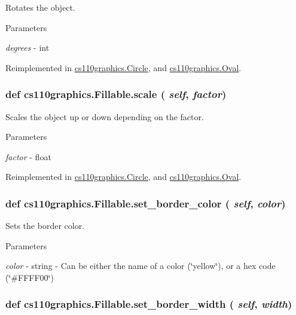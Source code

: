 Rotates the object. 
\begin{DoxyParams}{Parameters}
\item[{\em degrees}]-\/ int \end{DoxyParams}


Reimplemented in \hyperlink{classcs110graphics_1_1Circle_a0532651c10c084766ac3032c57107eb0}{cs110graphics.Circle}, and \hyperlink{classcs110graphics_1_1Oval_a98bb8103f19d2df5a875db6943fde6e2}{cs110graphics.Oval}.\hypertarget{classcs110graphics_1_1Fillable_a80d5b6b6d2ebae867dccecb803075749}{
\subsubsection[{scale}]{\setlength{\rightskip}{0pt plus 5cm}def cs110graphics.Fillable.scale ( {\em self}, \/   {\em factor})}}
\label{classcs110graphics_1_1Fillable_a80d5b6b6d2ebae867dccecb803075749}


Scales the object up or down depending on the factor. 
\begin{DoxyParams}{Parameters}
\item[{\em factor}]-\/ float \end{DoxyParams}


Reimplemented in \hyperlink{classcs110graphics_1_1Circle_a9ffed9eb3f191fafadd5b2d7e7735c18}{cs110graphics.Circle}, and \hyperlink{classcs110graphics_1_1Oval_accf5ef95d1127e0abe9f09823051d75f}{cs110graphics.Oval}.\hypertarget{classcs110graphics_1_1Fillable_a2f830be5d970faac97759910d20d68a4}{
\subsubsection[{set\_\-border\_\-color}]{\setlength{\rightskip}{0pt plus 5cm}def cs110graphics.Fillable.set\_\-border\_\-color ( {\em self}, \/   {\em color})}}
\label{classcs110graphics_1_1Fillable_a2f830be5d970faac97759910d20d68a4}


Sets the border color. 
\begin{DoxyParams}{Parameters}
\item[{\em color}]-\/ string -\/ Can be either the name of a color (\char`\"{}yellow\char`\"{}), or a hex code (\char`\"{}\#FFFF00\char`\"{}) \end{DoxyParams}
\hypertarget{classcs110graphics_1_1Fillable_a09f05462cb2ed38fdccb244340f05b2b}{
\subsubsection[{set\_\-border\_\-width}]{\setlength{\rightskip}{0pt plus 5cm}def cs110graphics.Fillable.set\_\-border\_\-width ( {\em self}, \/   {\em width})}}
\label{classcs110graphics_1_1Fillable_a09f05462cb2ed38fdccb244340f05b2b}


